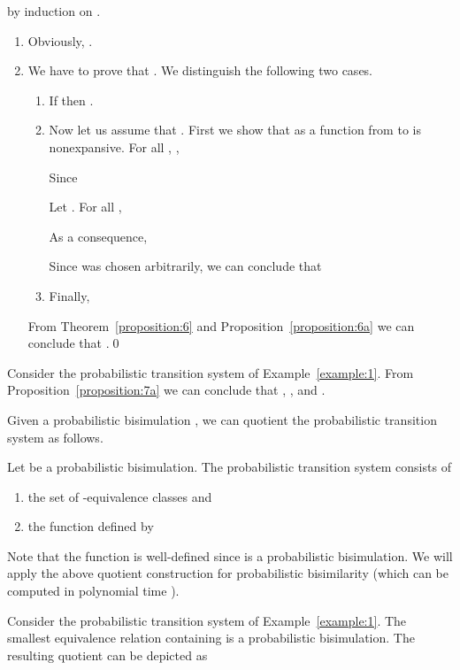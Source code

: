 \documentclass{LMCS}
\begin{document}
by induction on .
\begin{enumerate}[]
\item
Obviously, .
\item
We have to prove that .  We
distinguish the following two cases.
\begin{enumerate}[]
\item
If 
then .
\item
Now let us assume that .  First we show that
 as a function from  to  is nonexpansive.
For all , ,

Since


Let .  For all ,

As a consequence,

Since  was chosen arbitrarily, we can conclude that

\item
Finally,

\end{enumerate}
From Theorem~\ref{proposition:6} and Proposition~\ref{proposition:6a} we can conclude 
that .\qed
\end{enumerate}


\begin{exa}
Consider the probabilistic transition system of Example~\ref{example:1}.
From Proposition~\ref{proposition:7a} we can conclude that
, ,
 and .
\end{exa}

Given a probabilistic bisimulation , we can quotient the probabilistic
transition system  as follows.

\begin{defi}
Let  be a probabilistic bisimulation.  The probabilistic transition
system  consists of
\begin{enumerate}[]
\item
the set  of -equivalence classes and 
\item
the function  defined by

\end{enumerate}
\end{defi}

Note that the function  is well-defined since  
is a probabilistic bisimulation.  We will apply the above quotient 
construction for probabilistic bisimilarity (which can be computed in
polynomial time \cite{BEM00:jcss}).

\begin{exa}
Consider the probabilistic transition system of Example~\ref{example:1}.
The smallest equivalence relation containing  is a 
probabilistic bisimulation.  The resulting quotient can be depicted as

\end{exa}
\end{document}
